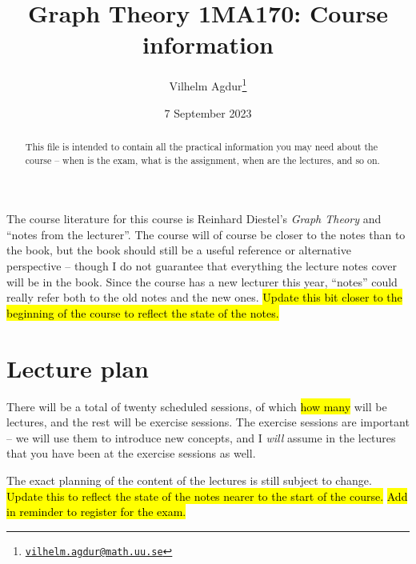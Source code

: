 \documentclass{tufte-handout}
\title{Graph Theory 1MA170: Course information}
\author[Vilhelm Agdur]{Vilhelm Agdur\thanks{\href{mailto:vilhelm.agdur@math.uu.se}{\nolinkurl{vilhelm.agdur@math.uu.se}}}}
\date{7 September 2023}
\begin{document}
\maketitle%

\begin{abstract}
\noindent
This file is intended to contain all the practical information you may need about the course -- when is the exam, what is the assignment, when are the lectures, and so on.
\end{abstract}

The course literature for this course is Reinhard Diestel's \emph{Graph Theory} and ``notes from the lecturer''. The course will of course be closer to the notes than to the book, but the book should still be a useful reference or alternative perspective -- though I do not guarantee that everything the lecture notes cover will be in the book. Since the course has a new lecturer this year, ``notes'' could really refer both to the old notes and the new ones. \hl{Update this bit closer to the beginning of the course to reflect the state of the notes.}

\section{Lecture plan}

There will be a total of twenty scheduled sessions, of which \hl{how many} will be lectures, and the rest will be exercise sessions. The exercise sessions are important -- we will use them to introduce new concepts, and I \emph{will} assume in the lectures that you have been at the exercise sessions as well.

The exact planning of the content of the lectures is still subject to change. \hl{Update this to reflect the state of the notes nearer to the start of the course.} \hl{Add in reminder to register for the exam.}
\end{document}
